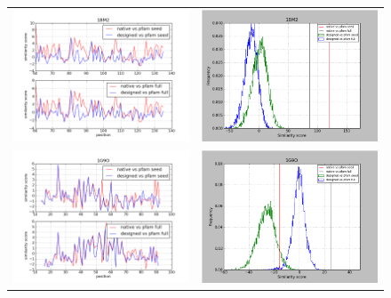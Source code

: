 \documentclass[a4paper,12pt]{article}
\begin{document}
   \begin{figure}[t]
     \centering
     \begin{tabular}{cc}
       \includegraphics[width=8.45cm]{gen_08032012/1BM2/ph/graph_simil_bypos.png} &
       \includegraphics[width=8.45cm]{gen_08032012/1BM2/ph/graph_simil_byseq.png} \\
       \includegraphics[width=8.45cm]{gen_08032012/1G9O/ph/graph_simil_bypos.png} &
       \includegraphics[width=8.45cm]{gen_08032012/1G9O/ph/graph_simil_byseq.png} \\

\end{tabular}
\end{figure}
\end{document}

